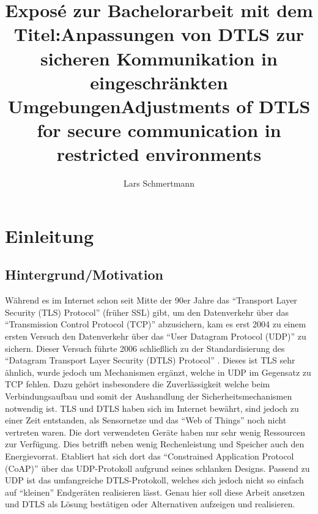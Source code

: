 \documentclass[a4paper,10pt]{report}
\title{Exposé zur Bachelorarbeit mit dem Titel:\newline\newline Anpassungen von DTLS zur sicheren Kommunikation in eingeschränkten Umgebungen\newline\newline Adjustments of DTLS for secure communication in restricted environments}
\author{Lars Schmertmann}
\begin{document}
\maketitle


\tableofcontents
\clearpage

\chapter{Einleitung}

\section{Hintergrund/Motivation}
Während es im Internet schon seit Mitte der 90er Jahre das  "`Transport Layer Security (TLS) Protocol"' \cite{rfc5246} (früher SSL) gibt,
um den Datenverkehr über das "`Transmission Control Protocol (TCP)"' abzusichern, kam es erst 2004 zu einem ersten Versuch den Datenverkehr
über das "`User Datagram Protocol (UDP)"' zu sichern. Dieser Versuch führte 2006 schließlich zu der Standardisierung des "`Datagram Transport
Layer Security (DTLS) Protocol"' \cite{rfc6347}. Dieses ist TLS sehr ähnlich, wurde jedoch um Mechanismen ergänzt, welche in UDP im Gegensatz
zu TCP fehlen. Dazu gehört insbesondere die Zuverlässigkeit welche beim Verbindungsaufbau und somit der Aushandlung der Sicherheitsmechanismen
notwendig ist. TLS und DTLS haben sich im Internet bewährt, sind jedoch zu einer Zeit entstanden, als Sensornetze und das
"`Web of Things"' noch nicht vertreten waren. Die dort verwendeten Geräte haben nur sehr wenig Ressourcen zur Verfügung.
Dies betrifft neben wenig Rechenleistung und Speicher auch den Energievorrat. Etabliert hat sich dort das "`Constrained
Application Protocol (CoAP)"' \cite{draftcoap} über das UDP-Protokoll aufgrund seines schlanken Designs. Passend zu UDP ist
das umfangreiche DTLS-Protokoll, welches sich jedoch nicht so einfach auf "`kleinen"' Endgeräten realisieren lässt.
Genau hier soll diese Arbeit ansetzen und DTLS als Lösung bestätigen oder Alternativen aufzeigen und realisieren.

\end{document}
